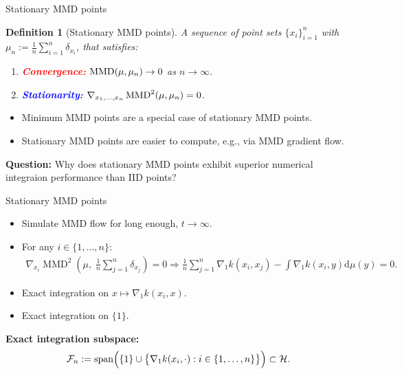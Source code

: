 \documentclass[aspectratio=169,xcolor=dvipsnames]{beamer}
\newcommand{\red}[1]{\textcolor{red}{#1}}
\newcommand{\blue}[1]{\textcolor{blue}{#1}}
\newenvironment{answer box}{%
    \begin{beamercolorbox}[wd=\linewidth, sep=0.33em, rounded=true]{answer box}%
}{%
    \end{beamercolorbox}%
}
\newtheorem{defi}{Definition}
\begin{document}
\begin{frame}{Stationary MMD points}
    \begin{defi}[Stationary MMD points]
        A sequence of point sets $\{x_i\}_{i=1}^n$ with
        $\mu_n := \frac{1}{n}\sum_{i=1}^n \delta_{x_i}$, that satisfies:
        \begin{enumerate}
            \item \textbf{\red{Convergence:}}
            $\operatorname{MMD}(\mu,\mu_n)\to 0$ as $n\to\infty$.
            \item \textbf{\blue{Stationarity:}}
            $\nabla_{x_1,\ldots,x_n}\operatorname{MMD}^2(\mu,\mu_n)=0$.
        \end{enumerate}
    \end{defi}
    \begin{itemize}
        \item Minimum MMD points are a special case of stationary MMD points.
        \item Stationary MMD points are easier to compute, e.g., via MMD gradient flow.
    \end{itemize}
    \vspace{0.3cm}
    \begin{exampleblock}{}
        \centering \textbf{Question:} Why does stationary MMD points exhibit superior numerical integraion performance than IID points?
    \end{exampleblock}
\end{frame}

\begin{frame}{Stationary MMD points}
\begin{itemize}
    \item Simulate MMD flow for long enough, $t\to\infty$. 
    \item For any $i\in\{1, \ldots, n\}$:  
\begin{align*}
    \nabla_{x_i} \operatorname{MMD}^2\left(\mu, \; \frac{1}{n} \sum_{j=1}^n \delta_{x_j}\right)=0 
    \Longrightarrow \frac{1}{n} \sum_{j=1}^n \nabla_1 k\left(x_i, x_j\right)-\int \nabla_1 k\left(x_i, y\right) \mathrm{d} \mu(y)=0. 
\end{align*}
    \item Exact integration on $x \mapsto \nabla_1 k\left(x_i, x\right)$.
    \item Exact integration on $\{1\}$.
\end{itemize}
\begin{exampleblock}{}
    \centering \textbf{Exact integration subspace:} 
    \vspace{-0.20cm}
    \begin{align*}
    \mathcal{F}_n := \operatorname{span}\Bigl(
    \{1\} \cup \bigl\{\nabla_1 k(x_i,\cdot) : i\in\{1, \ldots, n\}\bigr\}
    \Bigr) \subset \mathcal{H}.
    \end{align*}
\end{exampleblock}
\end{frame}
\end{document}
